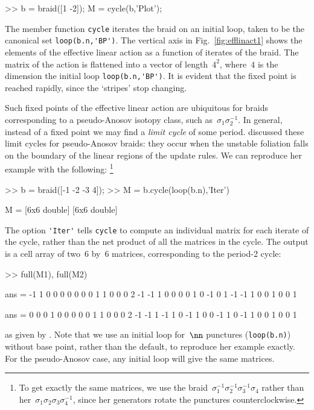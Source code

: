 \documentclass[12pt]{article}
\begin{document}
%
\begin{lstbraidlab}
>> b = braid([1 -2]); M = cycle(b,'Plot');
\end{lstbraidlab}
The member function \lstinline{cycle} iterates the braid on an initial loop,
taken to be the canonical set \lstinline{loop(b.n,'BP')}.  The vertical axis
in Fig.~\ref{fig:efflinact1} shows the elements of the effective linear action
as a function of iterates of the braid.  The matrix of the action is flattened
into a vector of length~$4^2$, where~$4$ is the dimension the initial loop
\lstinline{loop(b.n,'BP')}.  It is evident that the fixed point is reached
rapidly, since the `stripes' stop changing.

%
Such fixed points of the effective linear action are ubiquitous for braids
corresponding to a pseudo-Anosov isotopy class, such
as~$\sigma_1\sigma_2^{-1}$. %
In general, instead of a fixed point we may find a \emph{limit cycle} of some
period.  \citet{Yurttas2014_preprint} discussed these limit cycles for
pseudo-Anosov braids: they occur when the unstable foliation falls on the
boundary of the linear regions of the update rules.  We can reproduce her
example with the following:%
\footnote{To get exactly the same matrices, we use the
  braid~$\sigma_1^{-1}\sigma_2^{-1}\sigma_3^{-1}\sigma_4$ rather than
  her~$\sigma_1\sigma_2\sigma_3\sigma_4^{-1}$, since her generators rotate the
  punctures counterclockwise.}
%
\begin{lstbraidlab}
>> b = braid([-1 -2 -3 4]);
>> M = b.cycle(loop(b.n),'Iter')

M = [6x6 double]    [6x6 double]
\end{lstbraidlab}
The option \lstinline{'Iter'} tells \lstinline{cycle} to compute an individual
matrix for each iterate of the cycle, rather than the net product of all the
matrices in the cycle.  The output is a cell array %
%
of two~$6$ by~$6$ matrices, corresponding to the period-2 cycle:
\begin{lstbraidlab}
>> full(M{1}), full(M{2})

ans = -1     1     0     0     0     0
       0     0     0     1     1     0
       0     0     2    -1    -1     1
       0     0     0     0     1     0
      -1     0     1    -1    -1     1
       0     0     1     0     0     1

ans =  0     0     0     1     0     0
       0     0     0     1     1     0
       0     0     2    -1    -1     1
      -1     1     0    -1     1     0
       0    -1     1     0    -1     1
       0     0     1     0     0     1
\end{lstbraidlab}
as given by \citet{Yurttas2014_preprint}.  Note that we use an initial loop
for~$\nn$ punctures (\lstinline{loop(b.n)}) without base point, rather than
the default, to reproduce her example exactly.  For the pseudo-Anosov case,
any initial loop will give the same matrices.
\end{document}
